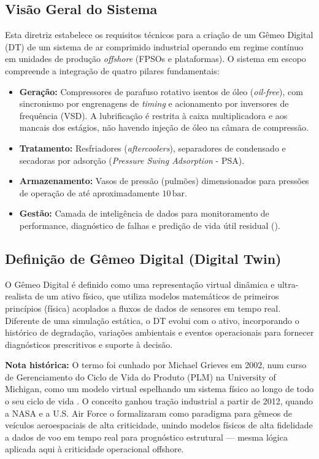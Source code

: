 \documentclass[12pt,a4paper]{article}
\numberwithin{equation}{section}
\numberwithin{table}{section}
\numberwithin{figure}{section}
\begin{document}
	\subsection{\textbf{Visão Geral do Sistema}}
	Esta diretriz estabelece os requisitos técnicos para a criação de um Gêmeo Digital (DT) de um sistema de ar comprimido industrial operando em regime contínuo em unidades de produção \textit{offshore} (FPSOs e plataformas). O sistema em escopo compreende a integração de quatro pilares fundamentais:
	
	\begin{itemize}
		\item \textbf{Geração:} Compressores de parafuso rotativo isentos de óleo (\textit{oil-free}), com sincronismo por engrenagens de \textit{timing} e acionamento por inversores de frequência (VSD). A lubrificação é restrita à caixa multiplicadora e aos mancais dos estágios, não havendo injeção de óleo na câmara de compressão.
		\item \textbf{Tratamento:} Resfriadores (\textit{aftercoolers}), separadores de condensado e secadoras por adsorção (\textit{Pressure Swing Adsorption} - PSA).
		\item \textbf{Armazenamento:} Vasos de pressão (pulmões) dimensionados para pressões de operação de até aproximadamente $10\,\text{bar}$.
		\item \textbf{Gestão:} Camada de inteligência de dados para monitoramento de performance, diagnóstico de falhas e predição de vida útil residual ().
	\end{itemize}
	
	\subsection{\textbf{Definição de Gêmeo Digital (Digital Twin)}}
	O Gêmeo Digital é definido como uma representação virtual dinâmica e ultra-realista de um ativo físico, que utiliza modelos matemáticos de primeiros princípios (física) acoplados a fluxos de dados de sensores em tempo real. Diferente de uma simulação estática, o DT evolui com o ativo, incorporando o histórico de degradação, variações ambientais e eventos operacionais para fornecer diagnósticos prescritivos e suporte à decisão.

	\textbf{Nota histórica:} O termo foi cunhado por Michael Grieves em 2002, num curso de Gerenciamento do Ciclo de Vida do Produto (PLM) na University of Michigan, como um modelo virtual espelhando um sistema físico ao longo de todo o seu ciclo de vida \cite{grieves}. O conceito ganhou tração industrial a partir de 2012, quando a NASA e a U.S. Air Force o formalizaram como paradigma para gêmeos de veículos aeroespaciais de alta criticidade, unindo modelos físicos de alta fidelidade a dados de voo em tempo real para prognóstico estrutural \cite{glaessgen} — mesma lógica aplicada aqui à criticidade operacional offshore.
\end{document}

